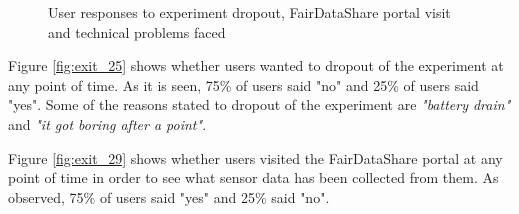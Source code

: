 \begin{figure}[htp]
\hspace{1em}
\newline
\centering
{}
\caption{User responses to experiment dropout, FairDataShare portal visit and technical problems faced}
\label{fig:st3}
\end{figure}

Figure \ref{fig:exit_25} shows whether users wanted to dropout of the experiment at any point of time. As it is seen, 75\% of users said "no" and 25\% of users said "yes". Some of the reasons stated to dropout of the experiment are \textit{"battery drain"} and \textit{"it got boring after a point"}.

Figure \ref{fig:exit_29} shows whether users visited the FairDataShare portal at any point of time in order to see what sensor data has been collected from them. As observed, 75\% of users said "yes" and 25\% said "no".

